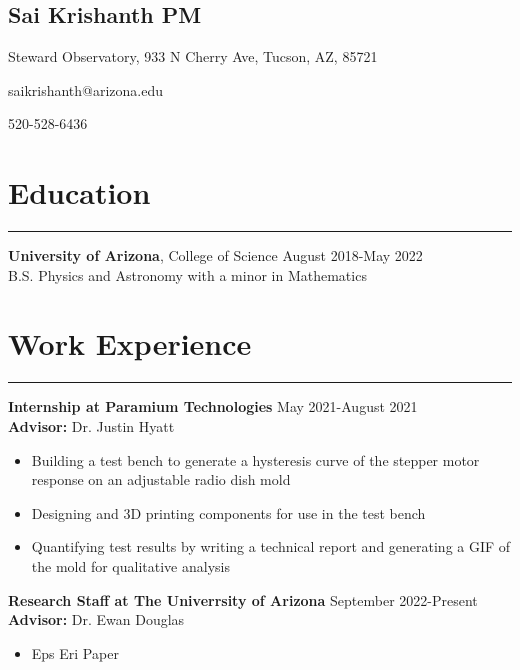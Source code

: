 \documentclass[11pt]{article}
\newcommand{\name}[1]{\begin{center}\section*{\huge #1}\end{center}}
\newcommand{\topinfo}[1]{\begin{center}\vspace{-0.2cm}#1\vspace{-0.2cm}\end{center}}
\newcommand{\resumesection}[1]{\vspace{-0.2cm}\section*{#1}\vspace{-0.2cm}\hrule\vspace{0.2cm}}
\begin{document}
\name{Sai Krishanth PM}
\topinfo{Steward Observatory, 933 N Cherry Ave, Tucson, AZ, 85721}
\topinfo{saikrishanth@arizona.edu}
\topinfo{520-528-6436}

\resumesection{Education}
\textbf{University of Arizona}, College of Science \hfill August 2018-May 2022
\\ B.S. Physics and Astronomy with a minor in Mathematics 

\resumesection{Work Experience}
\textbf{Internship at Paramium Technologies}  \hfill May 2021-August 2021
\\\textbf{Advisor:} Dr. Justin Hyatt
\begin{itemize}
	\item Building a test bench to generate a hysteresis curve of the stepper motor response on an adjustable radio dish mold
	\item Designing and 3D printing components for use in the test bench
	\item Quantifying test results by writing a technical report and generating a GIF of the mold for qualitative analysis
\end{itemize}
\textbf{Research Staff at The Univerrsity of Arizona}  \hfill September 2022-Present
\\\textbf{Advisor:} Dr. Ewan Douglas
\begin{itemize}
	\item Eps Eri Paper
\end{itemize}
\end{document}
